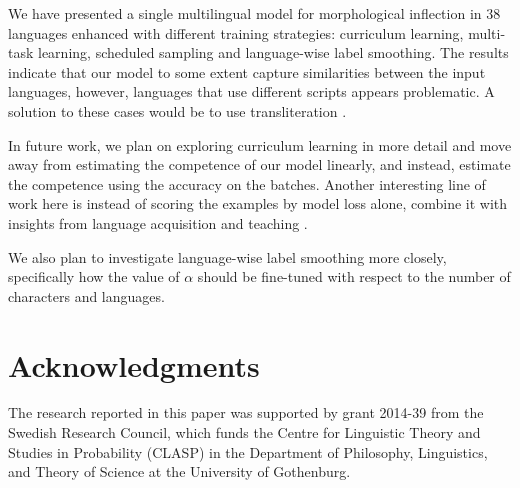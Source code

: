 \documentclass[11pt,a4paper]{article}
\begin{document}
We have presented a single multilingual model for morphological
inflection in $38$ languages enhanced with different training
strategies: curriculum learning, multi-task learning, scheduled
sampling and language-wise label smoothing.  The results indicate that
our model to some extent capture similarities between the input
languages, however, languages that use different scripts appears
problematic. A solution to these cases would be to use
transliteration \cite{murikinati-etal-2020-transliteration}.

In future work, we plan on exploring curriculum learning in more detail
and move away from estimating the competence of our model linearly,
and instead, estimate the competence using the accuracy on the
batches. Another interesting line of work here is instead of scoring
the examples by model loss alone, combine it with insights from
language acquisition and teaching \cite{ionin2002easier,
slabakova2010easy}.

We also plan to investigate language-wise label smoothing more
closely, specifically how the value of $\alpha$ should be fine-tuned
with respect to the number of characters and languages.

\section*{Acknowledgments}

The research reported in this paper was supported by grant 2014-39
from the Swedish Research Council, which funds the Centre for
Linguistic Theory and Studies in Probability (CLASP) in the Department
of Philosophy, Linguistics, and Theory of Science at the University
of Gothenburg.

 



\end{document}
